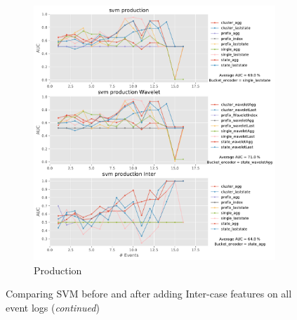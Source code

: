 \documentclass[twoside,11pt]{Latex/Classes/PhDthesisPSnPDF}
\begin{document}
\begin{figure}[!htbp]
\begin{subfigure}{0.48\textwidth}
		\includegraphics[width=\linewidth]{images/inter/svm/production.pdf}
		\caption{Production} \label{fig:proi}
	\end{subfigure}\hspace*{\fill}
\caption{Comparing SVM before and after adding Inter-case features on all event logs (\textit{continued})}
\label{fig:inters3}
\end{figure}

\end{document}
